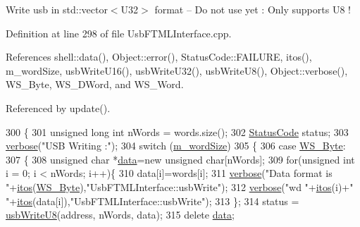 Write usb in std\+::vector$<$\+U32$>$ format -- Do not use yet \+: Only supports U8 ! 

Definition at line 298 of file Usb\+F\+T\+M\+L\+Interface.\+cpp.



References shell\+::data(), Object\+::error(), Status\+Code\+::\+F\+A\+I\+L\+U\+RE, itos(), m\+\_\+word\+Size, usb\+Write\+U16(), usb\+Write\+U32(), usb\+Write\+U8(), Object\+::verbose(), W\+S\+\_\+\+Byte, W\+S\+\_\+\+D\+Word, and W\+S\+\_\+\+Word.



Referenced by update().


\begin{DoxyCode}
300 \{
301   \textcolor{keywordtype}{unsigned} \textcolor{keywordtype}{long} \textcolor{keywordtype}{int} nWords = words.size();
302   \hyperlink{classStatusCode}{StatusCode} status;
303   \hyperlink{classObject_a83d2db2df682907ea1115ad721c1c4a1}{verbose}(\textcolor{stringliteral}{"USB Writing :"});
304   \textcolor{keywordflow}{switch} (\hyperlink{classUsbFTMLInterface_a39a8dfbe54cc29e033fa2a4d5fbbc982}{m\_wordSize})
305   \{
306   \textcolor{keywordflow}{case} \hyperlink{classUsbFTMLInterface_ae0f25daa336091a5acd548aef3e9b4b4a6d1f2c03dd60649290649efd7fb7f57d}{WS\_Byte}:
307     \{
308       \textcolor{keywordtype}{unsigned} \textcolor{keywordtype}{char} *\hyperlink{namespaceshell_a5ea2525995cedc3efd69ea8a7f034d1e}{data}=\textcolor{keyword}{new} \textcolor{keywordtype}{unsigned} \textcolor{keywordtype}{char}[nWords];
309       \textcolor{keywordflow}{for}(\textcolor{keywordtype}{unsigned} \textcolor{keywordtype}{int} i = 0; i < nWords; i++)\{
310         data[i]=words[i];
311         \hyperlink{classObject_a83d2db2df682907ea1115ad721c1c4a1}{verbose}(\textcolor{stringliteral}{"Data format is "}+\hyperlink{Tools_8h_af330027dbdafb9a30768b3613c553e60}{itos}(\hyperlink{classUsbFTMLInterface_ae0f25daa336091a5acd548aef3e9b4b4a6d1f2c03dd60649290649efd7fb7f57d}{WS\_Byte}),\textcolor{stringliteral}{"UsbFTMLInterface::usbWrite"});
312         \hyperlink{classObject_a83d2db2df682907ea1115ad721c1c4a1}{verbose}(\textcolor{stringliteral}{"wd "}+\hyperlink{Tools_8h_af330027dbdafb9a30768b3613c553e60}{itos}(i)+\textcolor{stringliteral}{" "}+\hyperlink{Tools_8h_af330027dbdafb9a30768b3613c553e60}{itos}(data[i]),\textcolor{stringliteral}{"UsbFTMLInterface::usbWrite"});
313       \};
314       status = \hyperlink{classUsbFTMLInterface_ae5cb7b250be9be23f90f455f57d41287}{usbWriteU8}(address, nWords, data);
315       \textcolor{keyword}{delete} \hyperlink{namespaceshell_a5ea2525995cedc3efd69ea8a7f034d1e}{data};

\end{DoxyCode}
